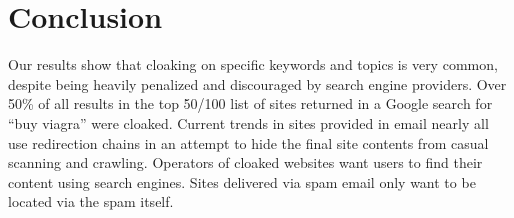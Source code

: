 \documentclass[letterpaper,twocolumn,10pt]{article}
\begin{document}
\section{Conclusion}

Our results show that cloaking on specific keywords and topics is very common, despite being heavily penalized and discouraged by search engine providers. Over 50\% of all results in the top 50/100 list of sites returned in a Google search for ``buy viagra'' were cloaked. Current trends in sites provided in email nearly all use redirection chains in an attempt to hide the final site contents from casual scanning and crawling.  Operators of cloaked websites want users to find their content using search engines.  Sites delivered via spam email only want to be located via the spam itself.

{
  \small
  
  
}
\end{document}
